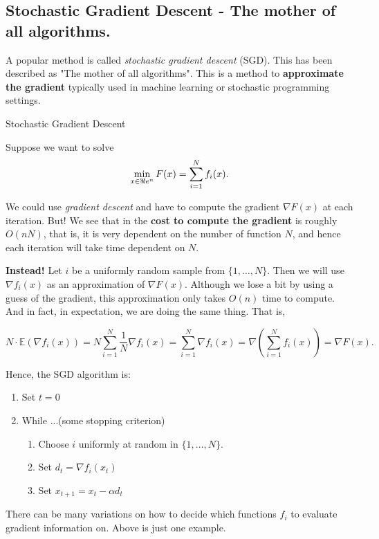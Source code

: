 \subsection{Stochastic Gradient Descent - The mother of all algorithms.}
 A popular method is called \emph{stochastic gradient descent} (SGD).   This has been described as "The mother of all algorithms".  
 This is a method to \textbf{approximate the gradient} typically used in machine learning or stochastic programming settings.  
 
\begin{general}{Stochastic Gradient Descent}{}

Suppose we want to solve
\begin{equation}
\min_{x \in \Re e^n} F(x) = \sum_{i=1}^N f_i(x).
\end{equation}

We could use \emph{gradient descent} and have to compute the gradient $\nabla F(x)$ at each iteration.  But!   We see that in the \textbf{cost to compute the gradient} is roughly $O(nN)$, that is, it is very dependent on the number of function $N$, and hence each iteration will take time dependent on $N$.

\textbf{Instead!} Let $i$ be a uniformly random sample from $\{1, \dots, N\}$.  Then we will use $\nabla f_i(x)$ as an approximation of $\nabla F(x)$.  Although we lose a bit by using a guess of the gradient, this approximation only takes $O(n)$ time to compute.  And in fact, in expectation, we are doing the same thing.  That is,

$$
N\cdot  \mathbb{E}( \nabla f_i(x)) = N \sum_{i=1}^N \frac{1}{N} \nabla f_i(x) =  \sum_{i=1}^N\nabla f_i(x) = \nabla \left(  \sum_{i=1}^N   f_i(x)\right) = \nabla F(x).
$$


Hence, the SGD algorithm is:

\begin{enumerate}
\item Set $t = 0$
\item While ...(some stopping criterion)
\begin{enumerate}
\item Choose $i$ uniformly at random in $\{1, \dots, N\}$.
\item Set $d_t = \nabla f_i(x_t)$
\item Set $x_{t+1} = x_t - \alpha d_t$
\end{enumerate}
\end{enumerate}

There can be many variations on how to decide which functions $f_i$ to evaluate gradient information on.  Above is just one example.

\end{general}
 
